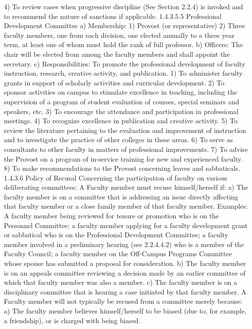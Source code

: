 \documentclass[letterpaper, 11pt]{article}
\begin{document}
			4) To review cases when progressive discipline (See Section 2.2.4) is invoked and to recommend the nature of sanctions if applicable.
			1.4.3.5.5 Professional Development Committee
			a) Membership:
			1) Provost (or representative)
			2) Three faculty members, one from each division, one elected annually to a three year term, at least one of whom must hold the rank of full professor.
			b) Officers:
			The chair will be elected from among the faculty members and shall appoint the secretary.
			c) Responsibilities:
			To promote the professional development of faculty instruction, research, creative activity, and publication.
			1) To administer faculty grants in support of scholarly activities and curricular development.
			2) To sponsor activities on campus to stimulate excellence in teaching, including the supervision of a program of student evaluation of courses, special seminars and speakers, etc.
			3) To encourage the attendance and participation in professional meetings.
			4) To recognize excellence in publication and creative activity.
			5) To review the literature pertaining to the evaluation and improvement of instruction and to investigate the practice of other colleges in these areas.
			6) To serve as consultants to other faculty in matters of professional improvements.
			7) To advise the Provost on a program of in-service training for new and experienced faculty.
			8) To make recommendations to the Provost concerning leaves and sabbaticals.
			1.4.3.6 Policy of Recusal
			Concerning the participation of faculty on various deliberating committees:  A Faculty member must recuse himself/herself if:
			a) The faculty member is on a committee that is addressing an issue directly affecting that faculty member or a close family member of that faculty member.  Examples: A faculty member being reviewed for tenure or promotion who is on the Personnel Committee; a faculty member applying for a faculty development grant or sabbatical who is on the Professional Development Committee; a faculty member involved in a preliminary hearing (see 2.2.4.4.2) who is a member of the Faculty Council; a faculty member on the Off-Campus Programs Committee whose spouse has submitted a proposal for consideration.
			b) The faculty member is on an appeals committee reviewing a decision made by an earlier committee of which that faculty member was also a member.
			c) The faculty member is on a disciplinary committee that is hearing a case initiated by that faculty member.
			A Faculty member will not typically be recused from a committee merely because:
			a) The faculty member believes himself/herself to be biased (due to, for example, a  friendship), or is charged with being biased.
\end{document}
